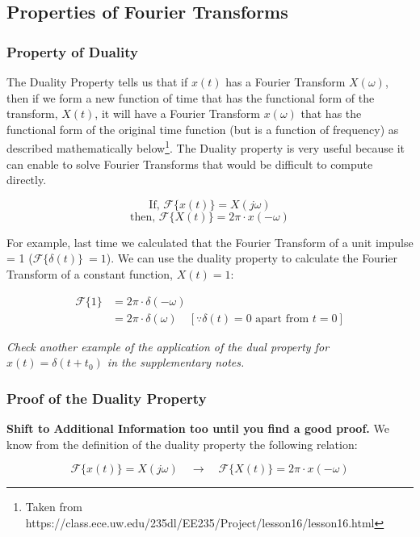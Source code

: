 \documentclass[letterpaper,12pt]{article}
\begin{document}
\newpage
\subsection*{Properties of Fourier Transforms}
\subsubsection*{Property of Duality}

The Duality Property tells us that if $x(t)$ has a Fourier Transform $X(\omega)$, then if we form a new function of time that has the functional form of the transform, $X(t)$, it will have a Fourier Transform $x(\omega)$ that has the functional form of the original time function (but is a function of frequency) as described mathematically below\footnote{Taken from https://class.ece.uw.edu/235dl/EE235/Project/lesson16/lesson16.html}. The Duality property is very useful because it can enable to solve Fourier Transforms that would be difficult to compute directly.

\[ \text{If, } \mathcal{F}\{x(t)\} = X(j\omega)\]
\[ \text{then, } \mathcal{F}\{X(t)\} = 2\pi\cdot x(-\omega)\]

For example, last time we calculated that the Fourier Transform of a unit impulse = 1 ($\mathcal{F}\{\delta(t)\}\ = 1$). We can use the duality property to calculate the Fourier Transform of a constant function, $X(t) = 1$:

\begin{equation*}
    \begin{aligned}
        \mathcal{F}\{1\} & = 2\pi\cdot\delta(-\omega)                                                         \\
                         & = 2\pi\cdot\delta(\omega) \quad [\text{$\because \delta(t) = 0$ apart from $t=0$}]
    \end{aligned}
\end{equation*}

\textit{Check another example of the application of the dual property for $x(t) = \delta(t + t_{0})$ in the supplementary notes.}

\subsubsection*{Proof of the Duality Property}
\textbf{Shift to Additional Information too until you find a good proof.}
We know from the definition of the duality property the following relation:

\[\mathcal{F}\{x(t)\} = X(j\omega) \quad \rightarrow \quad \mathcal{F}\{X(t)\} = 2\pi\cdot x(-\omega)\]
\end{document}
